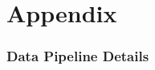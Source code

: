 \documentclass[12pt]{article}
\begin{document}
	
	
	
	
	
	
	
	
	\clearpage
	
	\pagestyle{plain}  
	
		
	
	
	
	\clearpage

\appendix

\part{Appendix} %

\parttoc %


\renewcommand\thefigure{\thesection.\arabic{figure}}   
\renewcommand\thetable{\thesection.\arabic{table}}
\setcounter{table}{0}


\clearpage






\section{Data Pipeline  Details}\label{sec:appendix_models}
\end{document}
